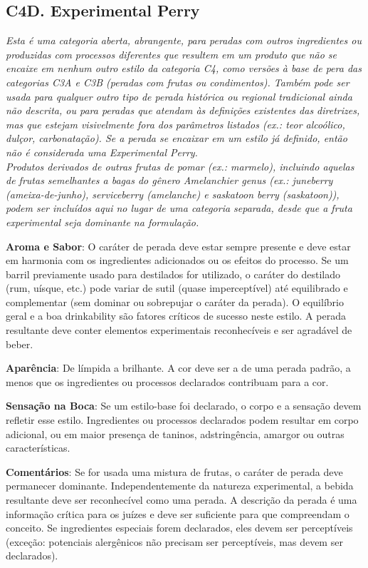 \subsection*{C4D. Experimental Perry}

\textit{Esta é uma categoria aberta, abrangente, para peradas com outros ingredientes ou produzidas com processos diferentes que resultem em um produto que não se encaixe em nenhum outro estilo da categoria C4, como versões à base de pera das categorias C3A e C3B (peradas com frutas ou condimentos). Também pode ser usada para qualquer outro tipo de perada histórica ou regional tradicional ainda não descrita, ou para peradas que atendam às definições existentes das diretrizes, mas que estejam visivelmente fora dos parâmetros listados (ex.: teor alcoólico, dulçor, carbonatação). Se a perada se encaixar em um estilo já definido, então não é considerada uma Experimental Perry.} \\
\textit{Produtos derivados de outras frutas de pomar (ex.: marmelo), incluindo aquelas de frutas semelhantes a bagas do gênero \textit{Amelanchier genus} (ex.: juneberry (ameixa-de-junho), serviceberry (amelanche) e saskatoon berry (saskatoon)), podem ser incluídos aqui no lugar de uma categoria separada, desde que a fruta experimental seja dominante na formulação.}

\textbf{Aroma e Sabor}: O caráter de perada deve estar sempre presente e deve estar em harmonia com os ingredientes adicionados ou os efeitos do processo. Se um barril previamente usado para destilados for utilizado, o caráter do destilado (rum, uísque, etc.) pode variar de sutil (quase imperceptível) até equilibrado e complementar (sem dominar ou sobrepujar o caráter da perada). O equilíbrio geral e a boa drinkability são fatores críticos de sucesso neste estilo. A perada resultante deve conter elementos experimentais reconhecíveis e ser agradável de beber.

\textbf{Aparência}: De límpida a brilhante. A cor deve ser a de uma perada padrão, a menos que os ingredientes ou processos declarados contribuam para a cor.

\textbf{Sensação na Boca}: Se um estilo-base foi declarado, o corpo e a sensação devem refletir esse estilo. Ingredientes ou processos declarados podem resultar em corpo adicional, ou em maior presença de taninos, adstringência, amargor ou outras características.

\textbf{Comentários}: Se for usada uma mistura de frutas, o caráter de perada deve permanecer dominante. Independentemente da natureza experimental, a bebida resultante deve ser reconhecível como uma perada. A descrição da perada é uma informação crítica para os juízes e deve ser suficiente para que compreendam o conceito. Se ingredientes especiais forem declarados, eles devem ser perceptíveis (exceção: potenciais alergênicos não precisam ser perceptíveis, mas devem ser declarados).

